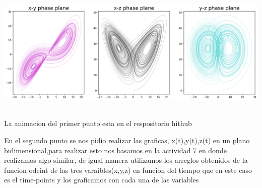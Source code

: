 \documentclass{article}
\begin{document}
\begin{center}
\includegraphics[height=6cm]{lorenz-attractor-phase-plane-1.png}
\end{center}



La animacion del primer punto esta en el respositorio hithub

\vspace{6.5cm}

En el segundo punto se nos pidio realizar las graficas, x(t),y(t),z(t) en un plano bidimensional,para realizar esto nos basamos en la actividad 7 en donde realizamos algo similar, de igual manera utilizamos los arreglos obtenidos de la funcion odeint de las tres varaibles(x,y,z) en funcion del tiempo que en este caso es el time-points y los graficamos con cada una de las variables
\end{document}
